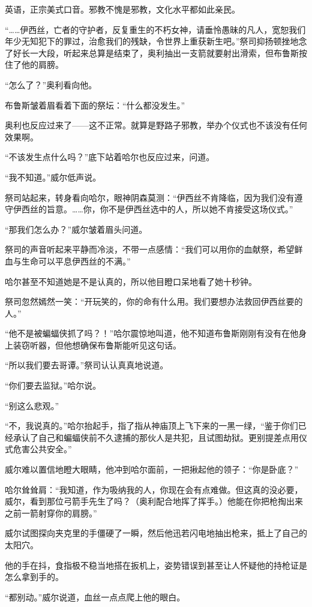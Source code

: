 \documentclass[../main]{subfiles}
\begin{document}
英语，正宗美式口音。邪教不愧是邪教，文化水平都如此亲民。

“……伊西丝，亡者的守护者，反复重生的不朽女神，请垂怜愚昧的凡人，宽恕我们年少无知犯下的罪过，治愈我们的残缺，令世界上重获新生吧。”祭司抑扬顿挫地念了好长一大段，听起来总算是结束了，奥利抽出一支箭就要射出滑索，但布鲁斯按住了他的肩膀。

“怎么了？”奥利看向他。

布鲁斯皱着眉看着下面的祭坛：“什么都没发生。”

奥利也反应过来了——这不正常。就算是野路子邪教，举办个仪式也不该没有任何效果啊。

“不该发生点什么吗？”底下站着哈尔也反应过来，问道。

“我不知道。”威尔低声说。

祭司站起来，转身看向哈尔，眼神阴森莫测：“伊西丝不肯降临，因为我们没有遵守伊西丝的旨意。……你，你不是伊西丝选中的人，所以她不肯接受这场仪式。”

“那我们怎么办？”威尔皱着眉头问道。

祭司的声音听起来平静而冷淡，不带一点感情：“我们可以用你的血献祭，希望鲜血与生命可以平息伊西丝的不满。”

哈尔甚至不知道她是不是认真的，所以他目瞪口呆地看了她十秒钟。

祭司忽然嫣然一笑：“开玩笑的，你的命有什么用。我们要想办法救回伊西丝要的人。”

“他不是被蝙蝠侠抓了吗？！”哈尔震惊地叫道，他不知道布鲁斯刚刚有没有在他身上装窃听器，但他想确保布鲁斯能听见这句话。

“所以我们要去哥谭。”祭司认认真真地说道。

“你们要去监狱。”哈尔说。

“别这么悲观。”

“不，我说真的。”哈尔抬起手，指了指从神庙顶上飞下来的一黑一绿，“鉴于你们已经承认了自己和蝙蝠侠前不久逮捕的那伙人是共犯，且试图劫狱。更别提差点用仪式危害公共安全。”

威尔难以置信地瞪大眼睛，他冲到哈尔面前，一把揪起他的领子：“你是卧底？”

哈尔耸耸肩：“我知道，作为吸纳我的人，你现在会有点难做。但这真的没必要，威尔，看到那位弓箭手先生了吗？（奥利配合地挥了挥手。）他能在你把枪掏出来之前一箭射穿你的肩膀。”

威尔试图探向夹克里的手僵硬了一瞬，然后他迅若闪电地抽出枪来，抵上了自己的太阳穴。

他的手在抖，食指极不稳当地搭在扳机上，姿势错误到甚至让人怀疑他的持枪证是怎么拿到手的。

“都别动。”威尔说道，血丝一点点爬上他的眼白。
\end{document}
